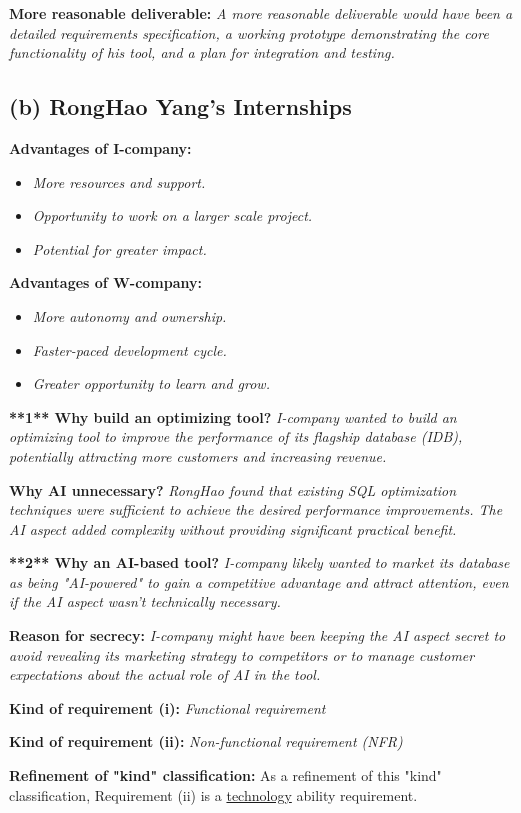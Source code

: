 \documentclass{article}
\begin{document}
\textbf{More reasonable deliverable:} \textit{A more reasonable deliverable would have been a detailed requirements specification, a working prototype demonstrating the core functionality of his tool, and a plan for integration and testing.}

\subsection*{(b) RongHao Yang's Internships}

\textbf{Advantages of I-company:}
\begin{itemize}
    \item \textit{More resources and support.}
    \item \textit{Opportunity to work on a larger scale project.}
    \item \textit{Potential for greater impact.}
\end{itemize}

\textbf{Advantages of W-company:}
\begin{itemize}
    \item \textit{More autonomy and ownership.}
    \item \textit{Faster-paced development cycle.}
    \item \textit{Greater opportunity to learn and grow.}
\end{itemize}

\textbf{**1** Why build an optimizing tool?} \textit{I-company wanted to build an optimizing tool to improve the performance of its flagship database (IDB), potentially attracting more customers and increasing revenue.}

\textbf{Why AI unnecessary?} \textit{RongHao found that existing SQL optimization techniques were sufficient to achieve the desired performance improvements. The AI aspect added complexity without providing significant practical benefit.}

\textbf{**2** Why an AI-based tool?} \textit{I-company likely wanted to market its database as being "AI-powered" to gain a competitive advantage and attract attention, even if the AI aspect wasn't technically necessary.}

\textbf{Reason for secrecy:} \textit{I-company might have been keeping the AI aspect secret to avoid revealing its marketing strategy to competitors or to manage customer expectations about the actual role of AI in the tool.}

\textbf{Kind of requirement (i):} \textit{Functional requirement}

\textbf{Kind of requirement (ii):} \textit{Non-functional requirement (NFR)}

\textbf{Refinement of "kind" classification:} As a refinement of this "kind" classification, Requirement (ii) is a \underline{technology} ability requirement.
\end{document}
